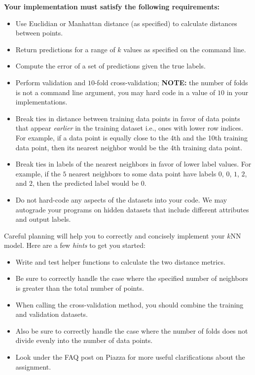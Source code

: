 \documentclass[11pt,addpoints,answers]{exam}
\begin{document}
\textbf{Your implementation must satisfy the following requirements:}
\begin{itemize}
\item Use Euclidian or Manhattan distance (as specified) to calculate distances between points.
\item Return predictions for a range of $k$ values as specified on the command line. 
\item Compute the error of a set of predictions given the true labels. 
\item Perform validation and $10$-fold cross-validation; \textbf{NOTE:} the number of folds is not a command line argument, you may hard code in a value of $10$ in your implementations.
\item Break ties in distance between training data points in favor of data points that appear \emph{earlier} in the training dataset i.e., ones with lower row indices. For example, if a data point is equally close to the 4th and the 10th training data point, then its nearest neighbor would be the 4th training data point.  
\item Break ties in labels of the nearest neighbors in favor of lower label values. For example, if the $5$ nearest neighbors to some data point have labels $0$, $0$, $1$, $2$, and $2$, then the predicted label would be $0$.
\item Do not hard-code any aspects of the datasets into your code. We may autograde your programs on hidden datasets that include different attributes and output labels.
\end{itemize}

Careful planning will help you to correctly and concisely implement your $k$NN model. Here are a few \emph{hints} to get you started:
\begin{itemize}
    \item Write and test helper functions to calculate the two distance metrics.
    \item Be sure to correctly handle the case where the specified number of neighbors is greater than the total number of points.
    \item When calling the cross-validation method, you should combine the training and validation datasets. 
    \item Also be sure to correctly handle the case where the number of folds does not divide evenly into the number of data points. 
    \item Look under the FAQ post on Piazza for more useful clarifications about the assignment.
\end{itemize}
\end{document}
